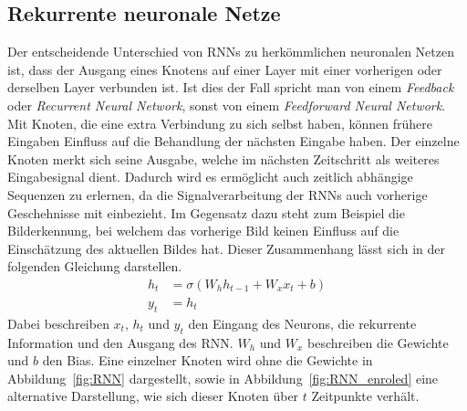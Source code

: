 %
        \subsection{Rekurrente neuronale Netze}
        \label{sec:RNN}

            Der entscheidende Unterschied von RNNs zu herkömmlichen neuronalen Netzen ist, dass der Ausgang eines Knotens auf einer Layer mit einer vorherigen oder derselben Layer verbunden ist.
            Ist dies der Fall spricht man von einem \textit{Feedback} oder \textit{Recurrent Neural Network}, sonst von einem \textit{Feedforward Neural Network}. 
            Mit Knoten, die eine extra Verbindung zu sich selbst haben, können frühere Eingaben Einfluss auf die Behandlung der nächsten Eingabe haben.
            Der einzelne Knoten merkt sich seine Ausgabe, welche im nächsten Zeitschritt als weiteres Eingabesignal dient.
            Dadurch wird es ermöglicht auch zeitlich abhängige Sequenzen zu erlernen, da die Signalverarbeitung der RNNs auch vorherige Geschehnisse mit einbezieht.
            Im Gegensatz dazu steht zum Beispiel die Bilderkennung, bei welchem das vorherige Bild keinen Einfluss auf die Einschätzung des aktuellen Bildes hat.
            Dieser Zusammenhang lässt sich in der folgenden Gleichung darstellen.
            \begin{equation}
                \begin{split}
                    h_t &= \sigma \left(W_{h}h_{t-1} + W_{x}x_{t} + b\right)\\
                    y_t &= h_t
                \end{split}
            \end{equation}
            Dabei beschreiben $x_t$, $h_t$ und $y_t$ den Eingang des Neurons, die rekurrente Information und den Ausgang des RNN\@.
            $W_h$ und  $W_x$ beschreiben die Gewichte und $b$ den Bias.
            Eine einzelner Knoten wird ohne die Gewichte in Abbildung~\ref{fig:RNN} dargestellt,
            sowie in Abbildung~\ref{fig:RNN_enroled} eine alternative Darstellung, wie sich dieser Knoten über $t$ Zeitpunkte verhält.
